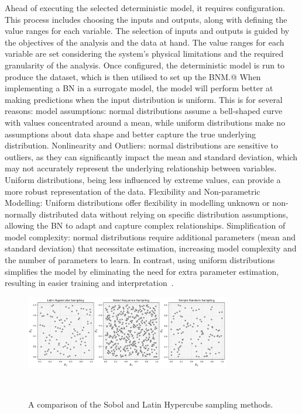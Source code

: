 \documentclass[journal]{IEEEtran}
\begin{document}
Ahead of executing the selected deterministic model, it requires configuration. This process includes choosing the inputs and outputs, along with defining the value ranges for each variable. The selection of inputs and outputs is guided by the objectives of the analysis and the data at hand. The value ranges for each variable are set considering the system's physical limitations and the required granularity of the analysis. Once configured, the deterministic model is run to produce the dataset, which is then utilised to set up the BNM.@ When implementing a BN in a surrogate model, the model will perform better at making predictions when the input distribution is uniform. This is for several reasons: model assumptions: normal distributions assume a bell-shaped curve with values concentrated around a mean, while uniform distributions make no assumptions about data shape and better capture the true underlying distribution. Nonlinearity and Outliers: normal distributions are sensitive to outliers, as they can significantly impact the mean and standard deviation, which may not accurately represent the underlying relationship between variables. Uniform distributions, being less influenced by extreme values, can provide a more robust representation of the data. Flexibility and Non-parametric Modelling: Uniform distributions offer flexibility in modelling unknown or non-normally distributed data without relying on specific distribution assumptions, allowing the BN to adapt and capture complex relationships. Simplification of model complexity: normal distributions require additional parameters (mean and standard deviation) that necessitate estimation, increasing model complexity and the number of parameters to learn. In contrast, using uniform distributions simplifies the model by eliminating the need for extra parameter estimation, resulting in easier training and interpretation~\cite{Duda1973,Neapolitan2004, Koller2009}.

\begin{figure}[t]
    \centering
    \includegraphics[width=0.8\textwidth]{figures/methodology/sobol_vs_lhs_simple.png}
    \caption{\small A comparison of the Sobol and Latin Hypercube sampling methods.}~\label{fig:sobol_vs_lhs}
\end{figure}
\end{document}
